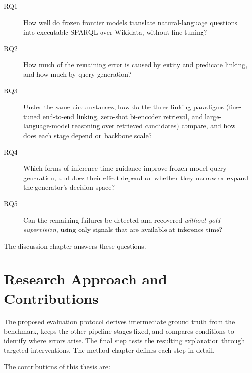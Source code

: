 \begin{description}
\item[RQ1]
How well do frozen frontier models translate natural-language questions into executable SPARQL over Wikidata, without fine-tuning?
\item[RQ2]
How much of the remaining error is caused by entity and predicate linking, and how much by query generation?
\item[RQ3]
Under the same circumstances, how do the three linking paradigms (fine-tuned end-to-end linking, zero-shot bi-encoder retrieval, and large-language-model reasoning over retrieved candidates) compare, and how does each stage depend on backbone scale?
\item[RQ4]
Which forms of inference-time guidance improve frozen-model query generation, and does their effect depend on whether they narrow or expand the generator's decision space?
\item[RQ5]
Can the remaining failures be detected and recovered \emph{without gold supervision}, using only signals that are available at inference time?
\end{description}

The discussion chapter answers these questions.

\section{Research Approach and
Contributions}

\label{sec:rqs}

\label{sec:contributions}

The proposed evaluation protocol derives intermediate ground truth from the benchmark, keeps the other pipeline stages fixed, and compares conditions to identify where errors arise. The final step tests the resulting explanation through targeted interventions.
The method chapter defines each step in detail.

The contributions of this thesis are:

